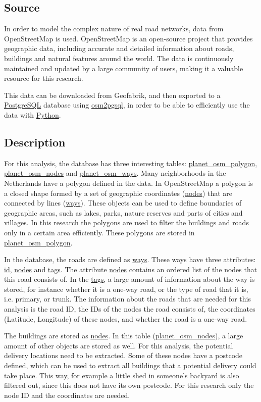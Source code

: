 \subsection{Source}
In order to model the complex nature of real road networks, data from OpenStreetMap \citep{openstreetmap} is used.
OpenStreetMap is an open-source project that provides geographic data, including accurate and
detailed information about roads, buildings and natural features around the world. The data is
continuously maintained and updated by a large community of users, making it a valuable resource
for this research.

This data can be downloaded from Geofabrik, and then exported to a \url{PostgreSQL} database using
\url{osm2pgsql}, in order to be able to efficiently use the data with \url{Python}.

\subsection{Description}
For this analysis, the database has three interesting tables: \url{planet_osm_polygon},\\
\url{planet_osm_nodes} and \url{planet_osm_ways}.
Many neighborhoods in the Netherlands have a polygon defined in the data.
In OpenStreetMap a polygon is a closed shape formed by a set of geographic coordinates
(\url{nodes}) that are connected by lines (\url{ways}). These objects can be used to define boundaries of
geographic areas, such as lakes, parks, nature reserves and parts of cities and villages. In this
research the polygons are used to filter the buildings and roads only in a certain area efficiently.
These polygons are stored in \url{planet_osm_polygon}.

In the database, the roads are defined as \url{ways}. These ways have three
attributes: \url{id}, \url{nodes} and \url{tags}. The attribute \url{nodes} contains an ordered list
of the nodes that this road consists of. In the \url{tags}, a large amount of
information about the way is stored, for instance whether it is a
one-way road, or the type of road that it is, i.e. primary, or trunk.
The information about the roads that are needed for this analysis is the
road ID, the IDs of the nodes the road consists of, the coordinates
(Latitude, Longitude) of these nodes, and whether the road is a one-way
road.

The buildings are stored as \url{nodes}. In this table (\url{planet_osm_nodes}),
a large amount of other objects are stored as well. For this analysis,
the potential delivery locations need to be extracted. Some of these
nodes have a postcode defined, which can be used to extract all buildings
that a potential delivery could take place. This way, for example a little shed in
someone's backyard is also filtered out, since this does not have its own
postcode. For this research only the node ID and the coordinates are
needed.

